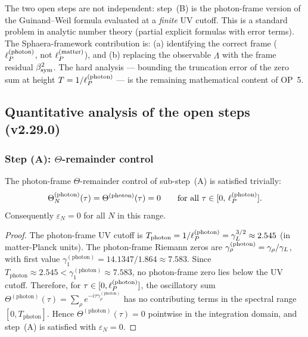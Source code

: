 \begin{remark}
\label{rem:op5-requires}
The two open steps are not independent: step~(B) is the
photon-frame version of the Guinand--Weil formula evaluated at a
\emph{finite} UV cutoff. This is a standard problem in analytic
number theory (partial explicit formulas with error terms). The
Sphaera-framework contribution is: (a) identifying the correct
frame ($\ell_P^{(\mathrm{photon})}$, not $\ell_P^{(\mathrm{matter})}$),
and (b) replacing the observable $\Lambda$ with the frame residual
$\beta_{\mathrm{sym}}^2$. The hard analysis — bounding the truncation error of the
zero sum at height $T = 1/\ell_P^{(\mathrm{photon})}$ — is the
remaining mathematical content of OP~5.
\end{remark}

\subsection{Quantitative analysis of the open steps (v2.29.0)}
\label{ssec:op5-quantitative}

\subsubsection*{Step (A): $\Theta$-remainder control}

\begin{proposition}
\label{prop:theta-remainder-trivial}
The photon-frame $\Theta$-remainder control of sub-step~(A) is
satisfied trivially:
\[
  \Theta^{(\mathrm{photon})}_N(\tau)
  = \Theta^{(\mathrm{photon})}(\tau)
  = 0
  \qquad
  \text{for all } \tau \in [0,\,\ell_P^{(\mathrm{photon})}].
\]
Consequently $\varepsilon_N = 0$ for all $N$ in this range.
\end{proposition}

\begin{proof}
The photon-frame UV cutoff is $T_{\mathrm{photon}} =
1/\ell_P^{(\mathrm{photon})} = \gamma_L^{3/2} \approx 2.545$ (in
matter-Planck units). The photon-frame Riemann zeros are
$\gamma_\rho^{(\mathrm{photon})} = \gamma_\rho/\gamma_L$, with first
value $\gamma_1^{(\mathrm{photon})} = 14.1347/1.864 \approx 7.583$.
Since $T_{\mathrm{photon}} \approx 2.545 < \gamma_1^{(\mathrm{photon})}
\approx 7.583$, no photon-frame zero lies below the UV cutoff.
Therefore, for $\tau \in [0, \ell_P^{(\mathrm{photon})}]$, the
oscillatory sum $\Theta^{(\mathrm{photon})}(\tau) =
\sum_\rho e^{-i\tau\gamma_\rho^{(\mathrm{photon})}}$ has no
contributing terms in the spectral range
$[0, T_{\mathrm{photon}}]$.
Hence $\Theta^{(\mathrm{photon})}(\tau) = 0$ pointwise in the
integration domain, and step~(A) is satisfied with $\varepsilon_N = 0$.
\end{proof}

